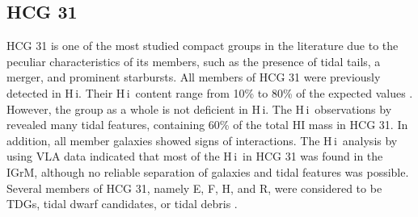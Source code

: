 \documentclass{aa}
\newcommand{\HI}{H\,{\sc i}}
\begin{document}
\subsection{HCG 31}
HCG 31 is one of the most studied compact groups in the literature due to the peculiar characteristics of its members, such as the presence of tidal tails, a merger, and prominent starbursts. 
All members of HCG 31 were previously detected in \HI. Their \HI\ content range from 10\% to 80\% of the expected values \citep{2005A&A...430..443V}. However, the group as a whole is not deficient in \HI. The \HI\ observations by \citet{2005A&A...430..443V} revealed many tidal features, 
containing 60\% of the total HI mass in HCG 31. In addition, all member galaxies showed signs of interactions. The \HI\ analysis by \citet{2023A&A...670A..21J} using VLA data indicated that most of the \HI\ in HCG 31 was found in the IGrM, although no reliable separation of galaxies and tidal features was possible. Several members of HCG 31, namely E, F, H, and R, were 
considered to be TDGs, tidal dwarf candidates, or tidal debris \citep{2003A&A...397...99R, 2004ApJS..153..243L, 2006AJ....132..570M, 2023MNRAS.522.2655G}. 
\end{document}
